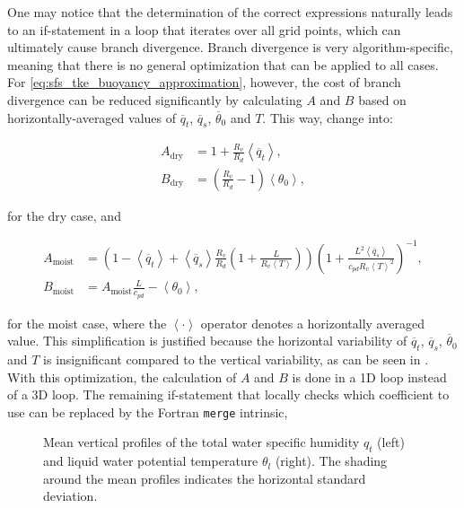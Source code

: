 One may notice that the determination of the correct expressions naturally leads to an if-statement in a loop that iterates over all grid points, which can ultimately cause branch divergence. Branch divergence is very algorithm-specific, meaning that there is no general optimization that can be applied to all cases. For \autoref{eq:sfs_tke_buoyancy_approximation}, however, the cost of branch divergence can be reduced significantly by calculating $A$ and $B$ based on horizontally-averaged values of $\overline{q}_t$, $\overline{q}_s$, $\overline{\theta}_0$ and $T$. This way,  change into:

\begin{equation}
  \begin{split}
    A_{\text{dry}} &= 1 + \frac{R_v}{R_d}\left< \overline{q}_t \right>, \\
    B_{\text{dry}} &= \left( \frac{R_v}{R_d} - 1 \right) \left< \theta_0 \right>,
  \end{split}
  \label{eq:dry_coefficients_averaged}
\end{equation}

for the dry case, and

\begin{equation}
  \begin{split}
    A_{\text{moist}} &= \left( 1 - \left< \overline{q}_t \right> + \left< \overline{q}_s \right> \frac{R_v}{R_d} \left( 1 + \frac{L}{R_v \left< T \right>} \right) \right) \left(1 + \frac{L^2 \left< \overline{q}_s \right>}{c_{pd} R_v \left< T \right>^2} \right)^{-1}, \\
    B_{\text{moist}} &= A_{\text{moist}} \frac{L}{c_{pd}} - \left< \theta_0 \right>,
  \end{split}
  \label{eq:wet_coefficients_averaged}
\end{equation}

for the moist case, where the $\left< \cdot \right>$ operator denotes a horizontally averaged value. This simplification is justified because the horizontal variability of $\overline{q}_t$, $\overline{q}_s$, $\overline{\theta}_0$ and $T$ is insignificant compared to the vertical variability, as can be seen in . With this optimization, the calculation of $A$ and $B$ is done in a 1D loop instead of a 3D loop. The remaining if-statement that locally checks which coefficient to use can be replaced by the Fortran \texttt{merge} intrinsic,  

\begin{figure}
  \centering
  
  \caption{Mean vertical profiles of the total water specific humidity $q_t$ (left) and liquid water potential temperature $\theta_l$ (right). The shading around the mean profiles indicates the horizontal standard deviation.}
  \label{fig:qt_thl_vs_height}
\end{figure}

